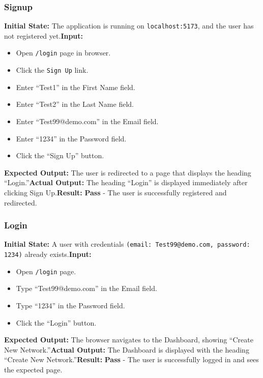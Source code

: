 \documentclass[12pt, titlepage]{article}
\begin{document}
\subsubsection{Signup} \textbf{Initial State:} The application is running on \texttt{localhost:5173}, and the user has not registered yet.\newline \textbf{Input:}
\begin{itemize} \item Open \texttt{/login} page in browser.
\item Click the \texttt{Sign Up} link.
\item Enter “Test1” in the First Name field.
\item Enter “Test2” in the Last Name field.
\item Enter “Test99@demo.com” in the Email field.
\item Enter “1234” in the Password field.
\item Click the “Sign Up” button.
\end{itemize} \textbf{Expected Output:} The user is redirected to a page that displays the heading “Login.”\newline \textbf{Actual Output:} The heading “Login” is displayed immediately after clicking Sign Up.\newline \textbf{Result:} \textbf{Pass} - The user is successfully registered and redirected.

\subsubsection{Login} \textbf{Initial State:} A user with credentials \texttt{(email: Test99@demo.com, password: 1234)} already exists.\newline \textbf{Input:} \begin{itemize} \item Open \texttt{/login} page.
\item Type “Test99@demo.com” in the Email field.
\item Type “1234” in the Password field.
\item Click the “Login” button.
\end{itemize} \textbf{Expected Output:} The browser navigates to the Dashboard, showing “Create New Network.”\newline \textbf{Actual Output:} The Dashboard is displayed with the heading “Create New Network.”\newline \textbf{Result:} \textbf{Pass} - The user is successfully logged in and sees the expected page.
\end{document}
